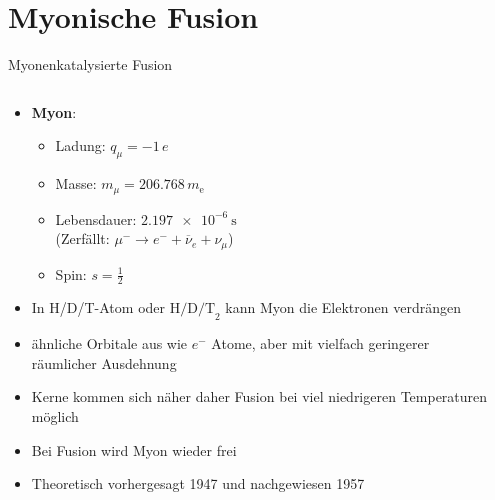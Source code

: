 \section{Myonische Fusion}

\begin{frame}{Myonenkatalysierte Fusion}
    \begin{columns}
        \begin{column}{0.55\textwidth}
            \begin{itemize}
                \item<+-> \textbf{Myon}:
                \begin{itemize}
                    \item Ladung: $q_\mu = -1\,e$
                    \item Masse: $m_\mu = 206.768\,m_\text{e}$
                    \item Lebensdauer: $\SI{2.197e-6}{\s}$ \\
                     (Zerfällt: $\mu^- \to e^- + \overline{\nu}_e + \nu_\mu$)
                    \item Spin: $s= \frac{1}{2}$
                \end{itemize}
                \item<+-> In H/D/T-Atom oder $\text{H/D/T}_2$ kann Myon die Elektronen verdrängen
                \item<+-> ähnliche Orbitale aus wie $e^-$ Atome, aber mit vielfach geringerer räumlicher Ausdehnung
                \item<+-> Kerne kommen sich näher daher Fusion bei viel niedrigeren Temperaturen möglich
                \item<+-> Bei Fusion wird Myon wieder frei
                \item<+-> Theoretisch vorhergesagt 1947 \cite{myonTheory} und nachgewiesen 1957 \cite{myonExp}
            \end{itemize}
        \end{column}
        \begin{column}{0.45\textwidth}
            \begin{center}

\end{center}
\end{column}
\end{columns}
\end{frame}
